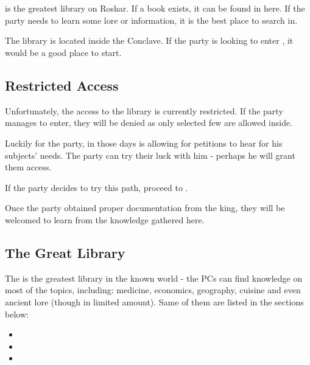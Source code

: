 \section{\locationPalanaeum{}}
\label{sec:palanaeum}

\locationPalanaeum{} is the greatest library on Roshar. If a book exists, it can be found in here. If the party needs to learn some lore or information, it is the best place to search in.

The library is located inside the Conclave. If the party is looking to enter , it would be a good place to start.

\subsection{Restricted Access}
\label{sec:palanaeumAcess}

Unfortunately, the access to the library is currently restricted. If the party manages to enter, they will be denied as only selected few are allowed inside.

Luckily for the party, in those days \npcTaravangian{} is allowing for petitions to hear for his subjects' needs. The party can try their luck with him - perhaps he will grant them access.

If the party decides to try this path, proceed to .

Once the party obtained proper documentation from the king, they will be welcomed to learn from the knowledge gathered here.




\subsection{The Great Library}
\label{ssec:palanaeumLibrary}

The \locationPalanaeum{} is the greatest library in the known world - the PCs can find knowledge on most of the topics, including: medicine, economics, geography, cuisine and even ancient lore (though in limited amount). Same of them are listed in the sections below:

\begin{itemize}
	\item {}
	\item {}
	\item {}
\end{itemize}

